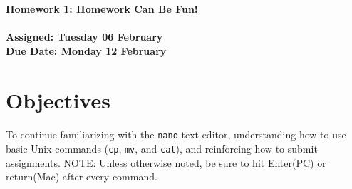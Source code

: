 \documentclass[letter,11pt]{article}
\begin{document}
\huge
\textbf{Homework 1: Homework Can Be Fun!}
\normalsize
\\ ~~ \\
\textbf{Assigned: Tuesday 06 February} \\
\textbf{Due Date: Monday 12 February}

\section*{Objectives}
\paragraph{}To continue familiarizing with the \texttt{nano} text editor, understanding how to use basic Unix commands (\texttt{cp}, \texttt{mv}, and \texttt{cat}), and reinforcing how to submit assignments. NOTE: Unless otherwise noted, be sure to hit Enter(PC) or return(Mac) after every command.
\end{document}
